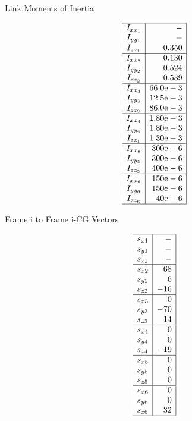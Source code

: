 Link Moments of Inertia

$$
\begin{array}{|c|r|}
\hline I_{x x_{1}} & - \\
I_{y y_{1}} & - \\
I_{z z_{1}} & 0.350 \\
\hline I_{x x_{2}} & 0.130 \\
I_{y y_{2}} & 0.524 \\
I_{z z_{2}} & 0.539 \\
\hline I_{x x_{3}} & 66.0 \mathrm{e}-3 \\
I_{y y_{3}} & 12.5 \mathrm{e}-3 \\
I_{z z_{3}} & 86.0 \mathrm{e}-3 \\
\hline I_{x x_{4}} & 1.80 \mathrm{e}-3 \\
I_{y y_{4}} & 1.80 \mathrm{e}-3 \\
I_{z z_{1}} & 1.30 \mathrm{e}-3 \\
\hline I_{x x_{8}} & 300 \mathrm{e}-6 \\
I_{y y_{5}} & 300 \mathrm{e}-6 \\
I_{z z_{5}} & 400 \mathrm{e}-6 \\
\hline I_{x x_{6}} & 150 \mathrm{e}-6 \\
I_{y y_{6}} & 150 \mathrm{e}-6 \\
I_{z z_{6}} & 40 \mathrm{e}-6 \\
\hline
\end{array}
$$

Frame {i} to Frame {i-CG} Vectors

$$
\begin{array}{|l|r|}
\hline s_{x 1} & - \\
s_{y 1} & - \\
s_{z 1} & - \\
\hline s_{x 2} & 68 \\
s_{y 2} & 6 \\
s_{z 2} & -16 \\
\hline s_{x 3} & 0 \\
s_{y 3} & -70 \\
s_{z 3} & 14 \\
\hline s_{x 4} & 0 \\
s_{y 4} & 0 \\
s_{z 4} & -19 \\
\hline s_{x 5} & 0 \\
s_{y 5} & 0 \\
s_{z 5} & 0 \\
\hline s_{x 6} & 0 \\
s_{y 6} & 0 \\
s_{z 6} & 32 \\
\hline
\end{array}
$$







